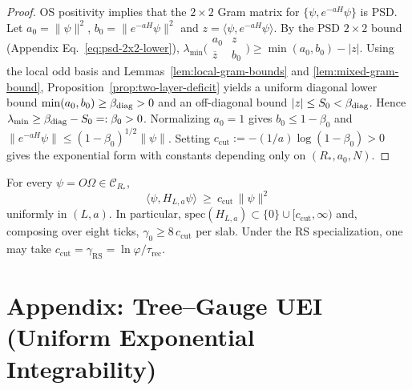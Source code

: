 \documentclass[11pt]{amsart}
\begin{document}
\begin{proof}
OS positivity implies that the $2\times 2$ Gram matrix for $\{\psi, e^{-aH}\psi\}$ is PSD. Let $a_0=\|\psi\|^2$, $b_0=\|e^{-aH}\psi\|^2$ and $z=\langle\psi, e^{-aH}\psi\rangle$. By the PSD $2\times 2$ bound (Appendix Eq.~\eqref{eq:psd-2x2-lower}), $\lambda_{\min}\bigl(\begin{smallmatrix} a_0 & z \\ \overline z & b_0 \end{smallmatrix}\bigr)\ge \min(a_0,b_0)-|z|$. Using the local odd basis and Lemmas~\ref{lem:local-gram-bounds} and \ref{lem:mixed-gram-bound}, Proposition~\ref{prop:two-layer-deficit} yields a uniform diagonal lower bound $\min(a_0,b_0)\ge \beta_{\rm diag}>0$ and an off-diagonal bound $|z|\le S_0<\beta_{\rm diag}$. Hence $\lambda_{\min}\ge \beta_{\rm diag}-S_0=:\beta_0>0$. Normalizing $a_0=1$ gives $b_0\le 1-\beta_0$ and $\|e^{-aH}\psi\|\le (1-\beta_0)^{1/2}\|\psi\|$. Setting $c_{\mathrm{cut}}:=-(1/a)\log(1-\beta_0)>0$ gives the exponential form with constants depending only on $(R_*,a_0,N)$.
\end{proof}

\begin{theorem}\label{thm:tp-bound}
For every $\psi=O\Omega\in\mathcal{C}_{R_*}$,
\[
  \langle\psi,H_{L,a}\psi\rangle\ \ge\ c_{\mathrm{cut}}\,\|\psi\|^2
\]
uniformly in $(L,a)$. In particular, $\mathrm{spec}(H_{L,a})\subset\{0\}\cup[c_{\mathrm{cut}},\infty)$ and, composing over eight ticks, $\gamma_0\ge 8\,c_{\mathrm{cut}}$ per slab. Under the RS specialization, one may take $c_{\mathrm{cut}}=\gamma_{\mathrm{RS}}=\ln\varphi/\tau_{\mathrm{rec}}$.
\end{theorem}

\section{Appendix: Tree--Gauge UEI (Uniform Exponential Integrability)}
\end{document}

